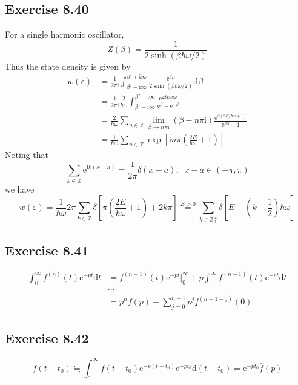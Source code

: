 \documentclass[]{ctexart}
\begin{document}
		\subsection{Exercise 8.40}
		For a single harmonic oscillator, 
		\begin{equation*}
		Z(\beta)=\frac{1}{2\sinh(\beta\hbar\omega/2)}
		\end{equation*}
		Thus the state density is given by 
		\begin{align*}
		w(\varepsilon)&=\frac{1}{2\pi\mathrm{i}}\int_{\beta'-\mathrm{i}\infty}^{\beta'+\mathrm{i}\infty}\frac{\mathrm{e}^{\beta E}}{2\sinh(\beta\hbar\omega/2)}\mathrm{d}\beta\\
		&=\frac{1}{2\pi\mathrm{i}}\frac{2}{\hbar\omega}\int_{\beta'-\mathrm{i}\infty}^{\beta'+\mathrm{i}\infty}\frac{\mathrm{e}^{2\beta E/\hbar\omega}}{\mathrm{e}^\beta-\mathrm{e}^{-\beta}}\\
		&=\frac{2}{\hbar\omega}\sum_{n\in\mathbb Z}\lim_{\beta\to n\pi\mathrm{i}}(\beta-n\pi\mathrm{i})\frac{\mathrm{e}^{\beta(2E/\hbar\omega+1)}}{\mathrm{e}^{2\beta}-1}\\
		&=\frac{1}{\hbar\omega}\sum_{n\in\mathbb Z}\exp\left[\mathrm{i}n\pi\left(\frac{2E}{\hbar\omega}+1\right)\right]
		\end{align*}
		Noting that 
		\begin{equation*}
		\sum_{k\in\mathbb Z}\mathrm{e}^{\mathrm{i}k(x-a)}=\frac{1}{2\pi}\delta(x-a),\;\;x-a\in(-\pi,\pi)
		\end{equation*}
		we have 
		\begin{equation*}
		w(\varepsilon)=\frac{1}{\hbar \omega}2\pi\sum_{k\in\mathbb Z}\delta\left[\pi\left(\frac{2E}{\hbar\omega}+1\right)+2k\pi\right]\overset{E>0}{=}\sum_{k\in\mathbb Z_0^+}\delta\left[E-\left(k+\frac{1}{2}\right)\hbar\omega\right]
		\end{equation*}
		
		\subsection{Exercise 8.41}
		\begin{align*}
		\int_0^\infty f^{(n)}(t)\mathrm{e}^{-pt}\mathrm{d}t&=f^{(n-1)}(t)\mathrm{e}^{-pt}\big|_0^\infty+p\int_0^\infty f^{(n-1)}(t)\mathrm{e}^{-pt}\mathrm{d}t\\
		&\cdots\\
		&=p^n\bar f(p)-\sum_{j=0}^{n-1}p^j f^{(n-1-j)}(0)
		\end{align*}
		
		\subsection{Exercise 8.42}
		\begin{equation*}
		f(t-t_0)\fallingdotseq \int_0^\infty f(t-t_0)\mathrm{e}^{-p(t-t_0)}\mathrm{e}^{-pt_0}\mathrm{d}(t-t_0)=\mathrm{e}^{-pt_0}\bar f(p)
		\end{equation*}
		
\end{document}
